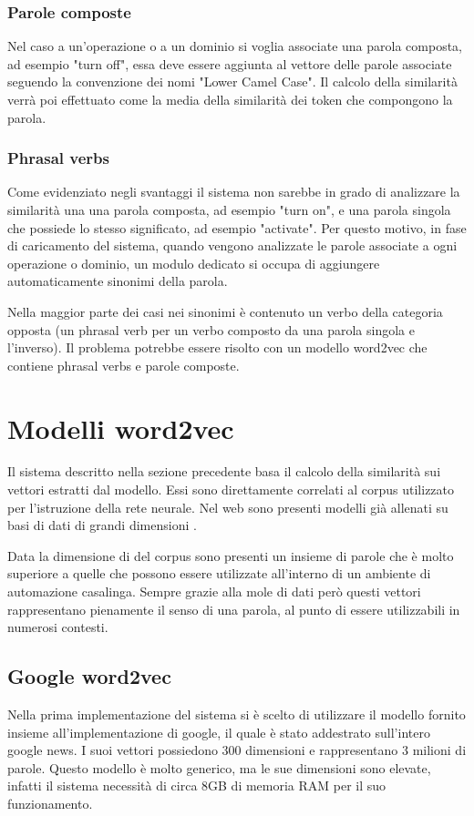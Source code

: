 \documentclass[twoside]{supsistudent}
\begin{document}
\subsection{Parole composte}
Nel caso a un'operazione o a un dominio si voglia associate una parola composta, ad esempio "turn off", essa deve essere aggiunta al vettore delle parole associate seguendo la convenzione dei nomi "Lower Camel Case". Il calcolo della similarità verrà poi effettuato come la media della similarità dei token che compongono la parola.\cite{lcc}
\subsection{Phrasal verbs}
Come evidenziato negli svantaggi il sistema non sarebbe in grado di analizzare la similarità una una parola composta, ad esempio "turn on", e una parola singola che possiede lo stesso significato, ad esempio "activate".
Per questo motivo, in fase di caricamento del sistema, quando vengono analizzate le parole associate a ogni operazione o dominio, un modulo dedicato si occupa di aggiungere automaticamente sinonimi della parola.

Nella maggior parte dei casi nei sinonimi è contenuto un verbo della categoria opposta (un phrasal verb per un verbo composto da una parola singola e l'inverso).
Il problema potrebbe essere risolto con un modello word2vec che contiene phrasal verbs e parole composte.
\chapter{Modelli word2vec}
Il sistema descritto nella sezione precedente basa il calcolo della similarità sui vettori estratti dal modello. Essi sono direttamente correlati al corpus \cite{corpus} utilizzato per l'istruzione della rete neurale. Nel web sono presenti modelli già allenati su basi di dati di grandi dimensioni \cite{trained_models}.

Data la dimensione di del corpus sono presenti un insieme di parole che è molto superiore a quelle che possono essere utilizzate all'interno di un ambiente di automazione casalinga. Sempre grazie alla mole di dati però questi vettori rappresentano pienamente il senso di una parola, al punto di essere utilizzabili in numerosi contesti.
\section{Google word2vec}
Nella prima implementazione del sistema si è scelto di utilizzare il modello fornito insieme all'implementazione di google, il quale è stato addestrato sull'intero google news. I suoi vettori possiedono 300 dimensioni e rappresentano 3 milioni di parole. Questo modello è molto generico, ma le sue dimensioni sono elevate, infatti il sistema necessità di circa 8GB di memoria RAM per il suo funzionamento.
\end{document}
